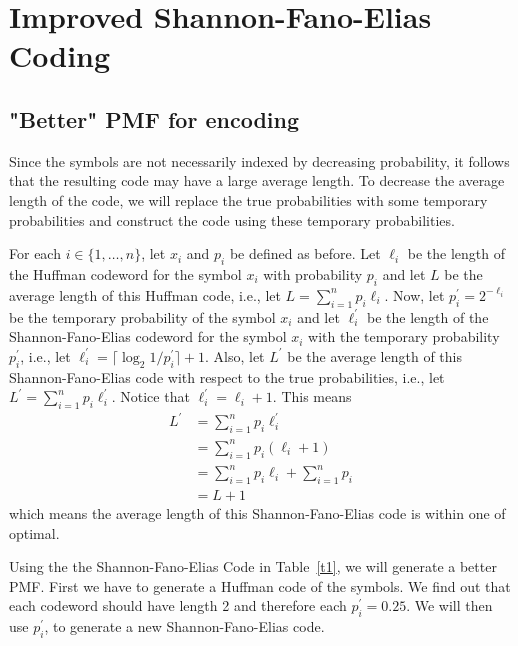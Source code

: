 \documentclass[10pt,letterpaper,notitlepage,draft]{article}
\theoremstyle{definition}
\begin{document}
\section{Improved Shannon-Fano-Elias Coding}

\subsection{"Better" PMF for encoding}
Since the symbols are not necessarily indexed by decreasing probability, it follows that the resulting code may have a large average length.
To decrease the average length of the code, we will replace the true probabilities with some temporary probabilities and construct the code using these temporary probabilities.

For each $i \in \lbrace 1, \ldots, n\rbrace$, let $x_i$ and $p_i$ be defined as before.
Let $\ell_i$ be the length of the Huffman codeword for the symbol $x_i$ with probability $p_i$ and let $L$ be the average length of this Huffman code, i.e., let $L = \sum_{i=1}^n p_i \ell_i$.
Now, let $p_i^\prime = 2^{-\ell_i}$ be the temporary probability of the symbol $x_i$ and let $\ell_i^\prime$ be the length of the Shannon-Fano-Elias codeword for the symbol $x_i$ with the temporary probability $p_i^\prime$, i.e., let $\ell_i^\prime =  \lceil\log_2 1 / p_i^\prime \rceil + 1$.
Also, let $L^\prime$ be the average length of this Shannon-Fano-Elias code with respect to the true probabilities, i.e., let $L^\prime = \sum_{i=1}^n p_i \ell_i^\prime$.
Notice that $\ell_i^\prime = \ell_i + 1$.
This means
\begin{align*}
L^\prime
&= \sum_{i=1}^n p_i \ell_i^\prime \\
&= \sum_{i=1}^n p_i \left(\ell_i + 1\right) \\
&= \sum_{i=1}^n p_i \ell_i + \sum_{i=1}^n p_i \\
&= L + 1
\end{align*}
which means the average length of this Shannon-Fano-Elias code is within one of optimal.

Using the the Shannon-Fano-Elias Code in Table~\ref{t1}, we will generate a better PMF. First we have to generate a Huffman code of the symbols. We find out that each codeword should have length 2 and therefore each $p_i^\prime = 0.25$. We will then use $p_i^\prime$, to generate a new Shannon-Fano-Elias code.
\end{document}

